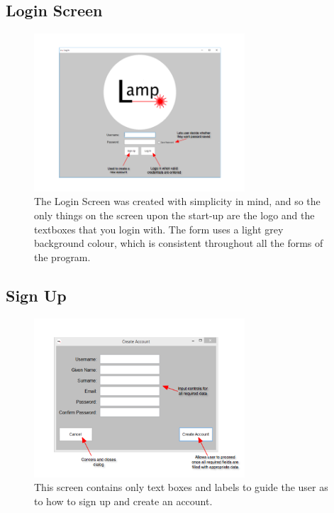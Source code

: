 \documentclass[oneside,openany,11pt,a4paper]{report}
\begin{document}
\subsection{Login Screen}
\begin{figure}[H]
\centering
\includegraphics[width=0.7\textwidth]{screen/login.png}
\caption{The Login Screen was created with simplicity in mind, and so the only things on the screen upon the start-up are the logo and the textboxes that you login with. The form uses a light grey background colour, which is consistent throughout all the forms of the program.}
\end{figure}

\subsection{Sign Up}
\begin{figure}[H]
	\centering
	\includegraphics[width=0.7\textwidth]{screen/signup.png}
	\caption{This screen contains only text boxes and labels to guide the user as to how to sign up and create an account.}
\end{figure}
\end{document}

